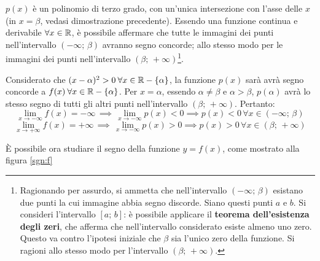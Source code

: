 $p(x)$ è un polinomio di terzo grado, con un'unica intersezione con l'asse delle $x$ (in $x=\beta$, vedasi dimostrazione precedente). Essendo una funzione continua e derivabile $\forall x\in\mathbb{R}$, è possibile affermare che tutte le immagini dei punti nell'intervallo $(-\infty; \,\beta)$ avranno segno concorde; allo stesso modo per le immagini dei punti nell'intervallo $(\beta; \,+\infty)$\footnote{Ragionando per assurdo, si ammetta che nell'intervallo $(-\infty; \,\beta)$ esistano due punti la cui immagine abbia segno discorde. Siano questi punti $a$ e $b$. Si consideri l'intervallo $[a;\,b]$: è possibile applicare il \textbf{teorema dell'esistenza degli zeri}, che afferma che nell'intervallo considerato esiste almeno uno zero. Questo va contro l'ipotesi iniziale che $\beta$ sia l'unico zero della funzione. Si ragioni allo stesso modo per l'intervallo $(\beta; \,+\infty)$.}.

Considerato che $(x-\alpha)^2>0\:\forall x\in \mathbb{R}-\{\alpha\}$, la funzione $p(x)$ sarà avrà segno concorde a $f(x)\:\forall x\in \mathbb{R}-\{\alpha\}$. Per $x=\alpha$, essendo $\alpha\neq\beta$ e $\alpha>\beta$, $p(\alpha)$ avrà lo stesso segno di tutti gli altri punti nell'intervallo $(\beta; \,+\infty)$. Pertanto:
\[
\lim_{x\to-\infty}f(x)=-\infty\,\implies\,\lim_{x\to-\infty}p(x)<0\implies p(x)<0\,\forall x\in (-\infty;\,\beta)
\]
\[
\lim_{x\to+\infty}f(x)=+\infty\,\implies\,\lim_{x\to-\infty}p(x)>0\implies p(x)>0\,\forall x\in(\beta; \,+\infty)
\]

È possibile ora {studiare il segno} della funzione $y=f(x)$, come mostrato alla figura \ref{sgn:f}
\begin{figure}
\end{figure}

